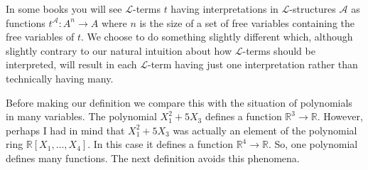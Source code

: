 \documentclass[11pt]{article}
\newcommand{\mcal}[1]{\mathcal{#1}}
\newcommand{\R}{\mathbb{R}}
\begin{document}
In some books you will see $\mcal{L}$-terms $t$ having interpretations in $\mcal{L}$-structures $\mcal{A}$ as functions $t^\mcal{A}:A^n\rightarrow A$ where $n$ is the size of a set of free variables containing the free variables of $t$. We choose to do something slightly different which, although slightly contrary to our natural intuition about how $\mcal{L}$-terms should be interpreted, will result in each $\mcal{L}$-term having just one interpretation rather than technically having many.

Before making our definition we compare this with the situation of polynomials in many variables. The polynomial $X_1^2+5X_3$ defines a function $\R^3\rightarrow \R$. However, perhaps I had in mind that $X_1^2+5X_3$ was actually an element of the polynomial ring $\R[X_1,\ldots,X_4]$. In this case it defines a function $\R^4\rightarrow \R$. So, one polynomial defines many functions. The next definition avoids this phenomena.
\end{document}
